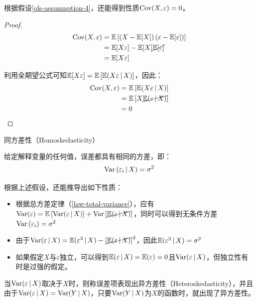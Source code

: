 \documentclass[11pt]{article}
\begin{document}
根据假设\ref{ols-assumnption-4}，还能得到性质$\operatorname{Cov}(X,\varepsilon)=0$。
\begin{proof}
    \begin{align*}
        \operatorname{Cov}(X,\varepsilon) &= \mathbb{E}\left[ \left(X - \mathbb{E}[X]\right) \left(\varepsilon - \mathbb{E}[\varepsilon]\right)\right] \\
        &= \mathbb{E}[X\varepsilon]- \mathbb{E}[X] \cancel{\mathbb{E}[\varepsilon]} \\
        &= \mathbb{E}[X\varepsilon]
    \end{align*}

    利用全期望公式可知$\mathbb{E}[X\varepsilon] = \mathbb{E}\left[\mathbb{E}(X\varepsilon \,\vert\, X)\right]$，因此：
    \begin{align*}
        \operatorname{Cov}(X,\varepsilon) &= \mathbb{E}\left[\mathbb{E}(X\varepsilon \,\vert\, X)\right] \\
        &= \mathbb{E}\left[ X \cancel{\mathbb{E}(\varepsilon \,\vert\, X)}\right] \\
        &= 0
    \end{align*}

\end{proof}

\begin{assumption}
    同方差性（Homoskedasticity）

    给定解释变量的任何值，误差都具有相同的方差，即：
    \begin{equation*}
        \operatorname{Var}\left(\varepsilon_i \,\vert\, X \right) = \sigma^2
    \end{equation*}

    \label{ols-assumnption-5}
\end{assumption}

根据上述假设，还能推导出如下性质：
\begin{itemize}
    \item 根据总方差定律（\ref{law-total-variance}），应有$\operatorname{Var}(\varepsilon) = \mathbb{E}\left[ \operatorname{Var}(\varepsilon \,\vert\, X) \right] + \operatorname{Var}\left[ \cancel{\mathbb{E}(\varepsilon \,\vert\, X)} \right]$，同时可以得到无条件方差$\operatorname{Var}\left(\varepsilon_i \right) = \sigma^2$
    \item 由于$\operatorname{Var}(\varepsilon \,\vert\, X) = \mathbb{E}(\varepsilon^2 \,\vert\, X) - \left[ \cancel{\mathbb{E}(\varepsilon \,\vert\, X)} \right]^2$，因此$\mathbb{E}(\varepsilon^2 \,\vert\, X) = \sigma^2$
    \item 如果假定$X$与$\varepsilon$独立，可以得到$\mathbb{E}(\varepsilon \,\vert\, X) = \mathbb{E}(\varepsilon) =0$且$\operatorname{Var}(\varepsilon \,\vert\, X)$，但独立性有时是过强的假定。
\end{itemize}

当$\operatorname{Var}(\varepsilon \,\vert\, X)$取决于$X$时，则称误差项表现出异方差性（Heteroskedasticity），并且由于$\operatorname{Var}(\varepsilon \,\vert\, X) = \operatorname{Var}(Y \,\vert\, X)$，只要$\operatorname{Var}(Y \,\vert\, X)$为$X$的函数时，就出现了异方差性。
\end{document}
